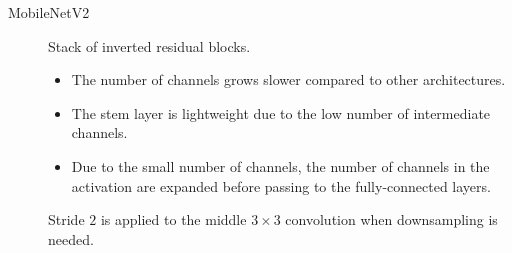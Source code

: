\begin{description}
    \item[MobileNetV2]  
        Stack of inverted residual blocks.
        \begin{itemize}
            \item The number of channels grows slower compared to other architectures.
            \item The stem layer is lightweight due to the low number of intermediate channels.
            \item Due to the small number of channels, the number of channels in the activation are expanded before passing to the fully-connected layers.
        \end{itemize}

        \begin{remark}
            Stride $2$ is applied to the middle $3 \times 3$ convolution when downsampling is needed.
        \end{remark}


\end{description}
